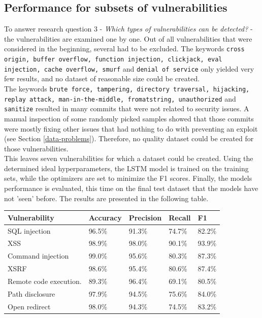 \documentclass[
a4paper,
pagesize,
pdftex,
12pt,
twoside, %
BCOR=5mm, %
ngerman,
fleqn,
final,
]{scrartcl}
\begin{document}
	
	
	\subsection{Performance for subsets of vulnerabilities}\label{vulnerabilities}
	
	To answer research question 3 - \textit{Which types of vulnerabilities can be detected?} - the vulnerabilities are examined one by one. Out of all vulnerabilities that were considered in the beginning, several had to be excluded. The keywords \texttt{cross origin, buffer overflow, function injection, clickjack, eval injection, cache overflow, smurf} and \texttt{denial of service} only yielded very few results, and no dataset of reasonable size could be created.\\
	The keywords \texttt{brute force, tampering, directory traversal, hijacking, replay attack, man-in-the-middle, fromatstring, unauthorized} and \texttt{sanitize} resulted in many commits that were not related to security issues. A manual inspection of some randomly picked samples showed that those commits were mostly fixing other issues that had nothing to do with preventing an exploit (see Section \ref{data-problems}). Therefore, no quality dataset could be created for those vulnerabilities.\\
	This leaves seven vulnerabilities for which a dataset could be created. Using the determined ideal hyperparameters, the LSTM model is trained on the training sets, while the optimizers are set to minimize the F1 scores. Finally, the models performance is evaluated, this time on the final test dataset that the models have not 'seen' before. The results are presented in the following table. 
	
	\begin{tabular}{ | p{5cm} || p{2cm}|p{2cm}|p{2cm}|p{2cm}|  }
		\hline
		\textbf{Vulnerability} & \textbf{Accuracy} & \textbf{Precision} & \textbf{Recall} & \textbf{F1} \\
		\hline
		SQL injection & 96.5\% & 91.3\% & 74.7\% & 82.2\% \\
		XSS & 98.9\% & 98.0\% & 90.1\% & 93.9\% \\
		Command injection & 99.0\%  & 95.6\% & 80.3\% & 87.3\%  \\
		XSRF & 98.6\% & 95.4\% & 80.6\% & 87.4\% \\
		Remote code execution.  & 89.3\% & 96.4\% & 69.1\% & 80.5\%\\
		Path disclosure & 97.9\% & 94.5\% & 75.6\% & 84.0\% \\
		Open redirect & 98.0\% & 94.3\% & 74.5\% & 83.2\%  \\
		\hline
		\hline
	\end{tabular}
	
\end{document}
